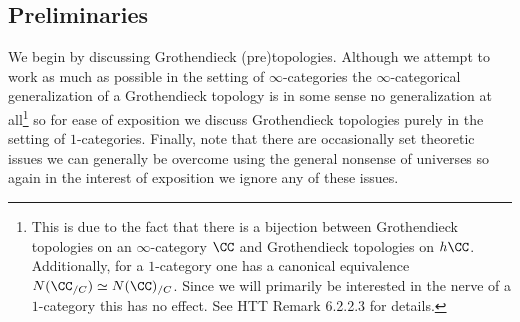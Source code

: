 \documentclass[12pt]{article}
\numberwithin{equation}{section}
\numberwithin{lemma}{section}
\numberwithin{theorem}{section}
\numberwithin{proposition}{section}
\numberwithin{corollary}{section}
\numberwithin{definition}{section}
\numberwithin{example}{section}
\numberwithin{remark}{section}
\begin{document}


\subsection{Preliminaries}

We begin by discussing Grothendieck (pre)topologies. Although we
attempt to work as much as possible in the setting of
$\infty$-categories the $\infty$-categorical generalization of a
Grothendieck topology is in some sense no generalization at
all\footnote{This is due to the fact that there is a bijection between
  Grothendieck topologies on an $\infty$-category $\CC$ and
  Grothendieck topologies on $h\CC$. Additionally, for a $1$-category
  one has a canonical equivalence $N(\CC_{/C}) \simeq
  N(\CC)_{/C}$. Since we will primarily be interested in the nerve of
  a $1$-category this has no effect. See HTT Remark 6.2.2.3 for
  details.} so for ease of exposition we discuss Grothendieck
topologies purely in the setting of $1$-categories. Finally, note that
there are occasionally set theoretic issues we can generally be
overcome using the general nonsense of universes so again in the
interest of exposition we ignore any of these issues.
\end{document}
